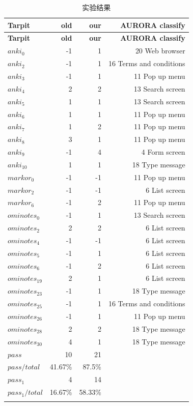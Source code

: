 \documentclass{article}
\begin{document}
\begin{longtable}[H]{lrrr}
        \toprule
        \textbf{Tarpit} & \textbf{old} & \textbf{our} & \textbf{AURORA classify} \\
        \midrule
        \endfirsthead
        \toprule
        \textbf{Tarpit} & \textbf{old} & \textbf{our} & \textbf{AURORA classify} \\
        \midrule
        \endhead
        $anki_0$ & -1 & 1 & 20 Web browser \\
        $anki_2$ & -1 & 1 & 16 Terms and conditions \\
        $anki_3$ & -1 & 1 & 11 Pop up menu \\
        $anki_4$ & 2 & 2 & 13 Search screen \\
        $anki_5$ & 1 & 1 & 13 Search screen \\
        $anki_6$ & 1 & 1 & 11 Pop up menu \\
        $anki_7$ & 1 & 2 & 11 Pop up menu \\
        $anki_8$ & 3 & 1 & 11 Pop up menu \\
        $anki_9$ & -1 & 4 & 4 Form screen \\
        $anki_{10}$ & 1 & 1 & 18 Type message \\
        $markor_0$ & -1 & -1 & 11 Pop up menu \\
        $markor_2$ & -1 & -1 & 6 List screen \\
        $markor_6$ & -1 & 2 & 11 Pop up menu \\
        $ominotes_0$ & -1 & 1 & 13 Search screen \\
        $ominotes_2$ & 2 & 2 & 6 List screen \\
        $ominotes_4$ & -1 & -1 & 6 List screen \\
        $ominotes_5$ & -1 & 1 & 6 List screen \\
        $ominotes_6$ & -1 & 2 & 6 List screen \\
        $ominotes_{19}$ & 2 & 1 & 6 List screen \\
        $ominotes_{23}$ & -1 & 1 & 18 Type message \\
        $ominotes_{25}$ & -1 & 1 & 16 Terms and conditions \\
        $ominotes_{26}$ & -1 & 1 & 11 Pop up menu \\
        $ominotes_{28}$ & 2 & 2 & 18 Type message \\
        $ominotes_{30}$ & 4 & 1 & 18 Type message \\
        \midrule
        $pass$ & 10 & 21 & \\
        $pass/total$ & 41.67\% & 87.5\% & \\
        $pass_1$ & 4 & 14 & \\
        $pass_1/total$ & 16.67\% & 58.33\% & \\
        \bottomrule
    \caption{实验结果}
    \label{tab:实验结果}
\end{longtable}
\end{document}
